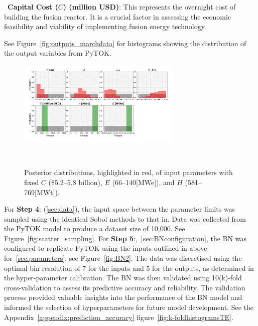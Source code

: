 \documentclass[journal]{IEEEtran}
\begin{document}
~\textbf{Capital Cost ($C$) (million USD)}: This represents the overnight cost of building the fusion reactor. It is a crucial factor in assessing the economic feasibility and viability of implementing fusion energy technology. 

See Figure~\ref{fig:outputs_marchdata} for histograms showing the distribution of the output variables from PyTOK.\@

\begin{figure}[t]
    \centering
    \includegraphics[width=0.7\textwidth]{figures/TE_results/march_data/config(57)_3outputs_v2_6.png}
    \caption{\small Posterior distributions, highlighted in red, of input parameters with fixed $C$ (\$5.2--5.8 billion), $E$ (66--140[MWe]), and $H$ (581--769[MWt]).}~\label{config(57)_outputs(4)3_eg}
\end{figure}

For \textbf{Step 4}: (\ref{sec:data}), the input space between the parameter limits was sampled using the identical Sobol methods to that in\cite{Griffiths2024}. Data was collected from the PyTOK model to produce a dataset size of 10,000. See Figure~\ref{fig:scatter_sampling}. For \textbf{Step 5}:,~\ref{sec:BNconfiguration}, the BN was configured to replicate PyTOK using the inputs outlined in above for~\ref{sec:parameters}, see Figure~\ref{fig:BN2}. The data was discretised using the optimal bin resolution of 7 for the inputs and 5 for the outputs, as determined in the hyper-parameter calibration. The BN was then validated using 10(k)-fold cross-validation to assess its predictive accuracy and reliability. The validation process provided valuable insights into the performance of the BN model and informed the selection of hyperparameters for future model development. See the Appendix~\ref{appendix:prediction_accuracy} figure~\ref{fig:k-foldhistogramsTE}.

\end{document}
